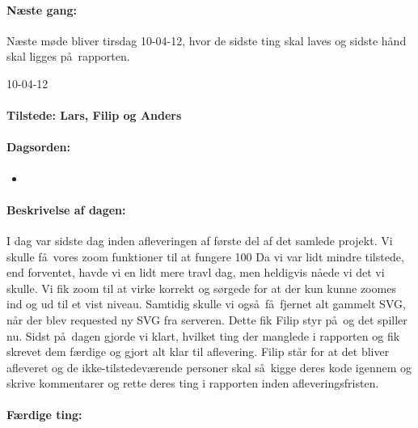 \documentclass[a4paper,10pt,titlepage]{article}
\begin{document}
		\paragraph{N\ae ste gang:}
		N\ae ste m\o de bliver tirsdag 10-04-12, hvor de sidste ting skal laves og sidste h\aa nd skal ligges p\aa \ rapporten. \mbox{}\\ 
		
		\begin{center}
		10-04-12
		\end{center}
		
		\paragraph{Tilstede: Lars, Filip og Anders}
		\paragraph{Dagsorden:}
		\begin{itemize}
					\item 
					 
		\end{itemize}
		
		\paragraph{Beskrivelse af dagen:}
		I dag var sidste dag inden afleveringen af f\o rste del af det samlede projekt. Vi skulle f\aa \ vores zoom funktioner til at fungere 100%
Da vi var lidt mindre tilstede, end forventet, havde vi en lidt mere travl dag, men heldigvis n\aa ede vi det vi skulle. Vi fik zoom til at virke korrekt og s\o rgede for at der kun kunne zoomes ind og ud til et vist niveau. Samtidig skulle vi ogs\aa \ f\aa \ fjernet alt gammelt SVG, n\aa r der blev requested ny SVG fra serveren. Dette fik Filip styr p\aa \ og det spiller nu. Sidst p\aa \ dagen gjorde vi klart, hvilket ting der manglede i rapporten og fik skrevet dem f\ae rdige og gjort alt klar til aflevering. Filip st\aa r for at det bliver afleveret og de ikke-tilstedev\ae rende personer skal s\aa \ kigge deres kode igennem og skrive kommentarer og rette deres ting i rapporten inden afleveringsfristen.

		\paragraph{F\ae rdige ting:}
		
\end{document}

